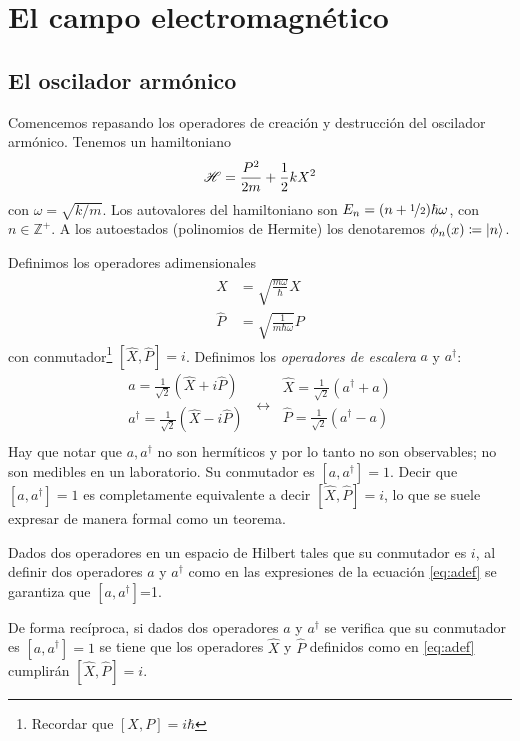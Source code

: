 \chapter{El campo electromagnético}

\section{El oscilador armónico}
Comencemos repasando los operadores de creación y destrucción del
oscilador armónico. Tenemos un hamiltoniano
\begin{equation}
  \mathscr{H} = \frac{P^2}{2m} + \frac{1}{2}k X^2
\end{equation}
con $\omega = \sqrt{k/m}$. Los autovalores del hamiltoniano son
$E_n=(n+{\nicefrac{1}{2}})\hbar\omega$, con $n\in \mathbb{Z}^+$. A los autoestados
(polinomios de Hermite) los denotaremos $\phi_n(x)\coloneqq \ket{n}$.

Definimos los operadores adimensionales
\begin{align}
  \hat{X} &= \sqrt{\frac{m\omega}{\hbar}} X \\
  \hat{P} &= \sqrt{\frac{1}{m\hbar\omega}} P 
\end{align}
con conmutador\footnote{Recordar que $[X,P]=i \hbar$}
$[\hat{X},\hat{P}]=i$. Definimos los \emph{operadores de escalera} $a$ y
$a^\dagger$:
\begin{equation}
  \begin{matrix}
    a = \frac{1}{\sqrt{2}}(\hat{X}+i\hat{P}) \\
    a^\dagger = \frac{1}{\sqrt{2}}(\hat{X}-i\hat{P}) \\
  \end{matrix} \ \leftrightarrow \
  \begin{matrix}
    \hat{X} = \frac{1}{\sqrt{2}}(a^\dagger+a) \\
    \hat{P} = \frac{1}{\sqrt{2}}(a^\dagger-a) \\
  \end{matrix} 
  \label{eq:adef}
\end{equation}
Hay que notar que $a,a^\dagger$ no son hermíticos y por lo tanto no
son observables; no son medibles en un laboratorio. Su conmutador
es $[a,a^\dagger]=1$. Decir que $[a,a^\dagger]=1$ es completamente equivalente a
decir $[\hat{X},\hat{P}]=i$, lo que se suele expresar de manera
formal como un teorema.

\begin{thm}
Dados dos operadores en un espacio de Hilbert tales que su conmutador
es $i$, al definir dos operadores $a$ y $a^\dagger$ como en las
expresiones de la ecuación \eqref{eq:adef} se garantiza que $[a,a^\dagger]$=1.

De forma recíproca, si dados dos operadores $a$ y $a^\dagger$ se
verifica que su conmutador es $[a,a^\dagger] =1$ se tiene que los
operadores $\hat{X}$ y $\hat{P}$ definidos como en \eqref{eq:adef}
cumplirán $[\hat{X},\hat{P}]=i$.
\end{thm}

